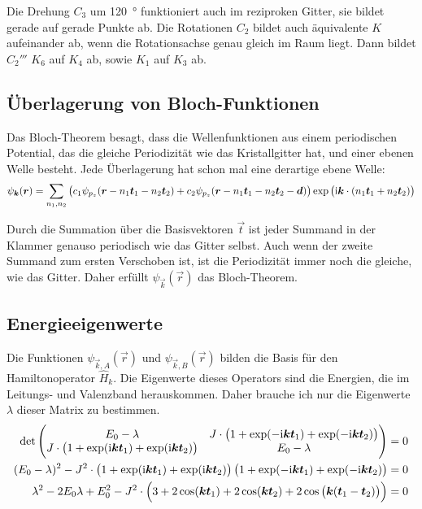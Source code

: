 Die Drehung $C_3$ um \SI{120}{\degree} funktioniert auch im reziproken Gitter,
sie bildet gerade auf gerade Punkte ab. Die Rotationen $C_2$ bildet auch
äquivalente $K$ aufeinander ab, wenn die Rotationsachse genau gleich im Raum
liegt. Dann bildet $C_2'''$ $K_6$ auf $K_4$ ab, sowie $K_1$ auf $K_3$ ab.

\subsection{Überlagerung von Bloch-Funktionen}

Das Bloch-Theorem besagt, dass die Wellenfunktionen aus einem periodischen
Potential, das die gleiche Periodizität wie das Kristallgitter hat, und einer
ebenen Welle besteht. Jede Überlagerung hat schon mal eine derartige ebene
Welle:
\[
	\psi_{\vec k} (\vec r)
	= 
	\sum_{n_1, n_2} \del{c_1 \psi_{p_z} (\vec r - n_1 \vec t_1 - n_2 \vec t_2) + c_2 \psi_{p_z} (\vec r - n_1 \vec t_1 - n_2 \vec t_2 - \vec d)} \exp\del{\ii \vec k \cdot (n_1 \vec t_1 + n_2 \vec t_2)}
\]

Durch die Summation über die Basisvektoren $\vec t$ ist jeder Summand in der
Klammer genauso periodisch wie das Gitter selbst. Auch wenn der zweite Summand
zum ersten Verschoben ist, ist die Periodizität immer noch die gleiche, wie das
Gitter. Daher erfüllt $\psi_{\vec k}(\vec r)$ das Bloch-Theorem.

\subsection{Energieeigenwerte}

Die Funktionen $\psi_{\vec k, A}(\vec r)$ und $\psi_{\vec k, B}(\vec r)$ bilden
die Basis für den Hamiltonoperator $\hat H_k$. Die Eigenwerte dieses Operators
sind die Energien, die im Leitungs- und Valenzband herauskommen. Daher brauche
ich nur die Eigenwerte $\lambda$ dieser Matrix zu bestimmen.
\begin{align*}
	\det \begin{pmatrix}
		E_0 - \lambda & J\cdot\del{1 + \exp(-\ii \vec k \vec t_1) + \exp(-\ii \vec k \vec t_2)} \\
		J\cdot\del{1 + \exp(\ii \vec k \vec t_1) + \exp(\ii \vec k \vec t_2)} & E_0 - \lambda
	\end{pmatrix}
	&= 0 \\
	(E_0 - \lambda)^2 - J^2\cdot \del{1 + \exp(\ii \vec k \vec t_1) + \exp(\ii \vec k \vec t_2)} \del{1 + \exp(-\ii \vec k \vec t_1) + \exp(-\ii \vec k \vec t_2)} &= 0 \\
	\lambda^2 - 2 E_0 \lambda + E_0^2 - J^2\cdot \del{3 + 2\cos(\vec k \vec t_1) + 2 \cos(\vec k \vec t_2) + 2 \cos\del{\vec k (\vec t_1 - \vec t_2)}} &= 0
\end{align*}

